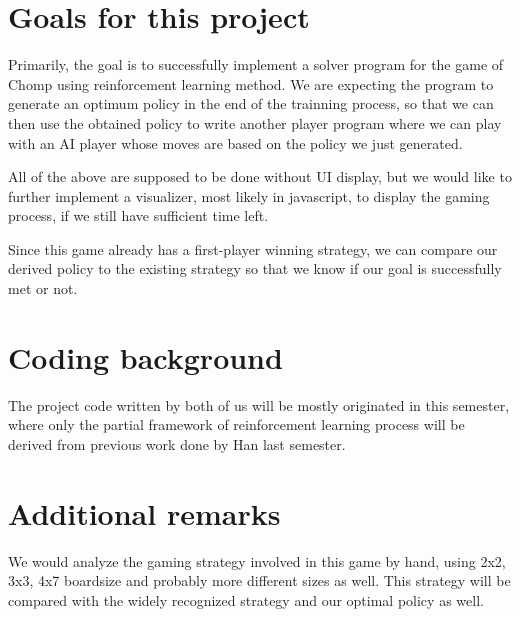 \documentclass[11pt,oneside,letterpaper]{article}
\begin{document}
\section{Goals for this project}
Primarily, the goal is to successfully implement a solver program for the game of Chomp using reinforcement learning method. We are expecting the program to generate an optimum policy in the end of the trainning process, so that we can then use the obtained policy to write another player program where we can play with an AI player whose moves are based on the policy we just generated.

All of the above are supposed to be done without UI display, but we would like to further implement a visualizer, most likely in javascript, to display the gaming process, if we still have sufficient time left.

Since this game already has a first-player winning strategy, we can compare our derived policy to the existing strategy so that we know if our goal is successfully met or not.

\section{Coding background}
The project code written by both of us will be mostly originated in this semester, where only the partial framework of reinforcement learning process will be derived from previous work done by Han last semester.

\section{Additional remarks}
We would analyze the gaming strategy involved in this game by hand, using 2x2, 3x3, 4x7 boardsize and probably more different sizes as well. This strategy will be compared with the widely recognized strategy and our optimal policy as well.
\end{document}
